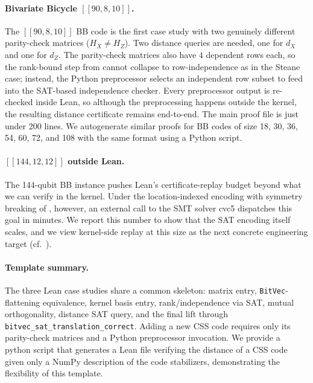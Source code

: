 \paragraph{Bivariate Bicycle $[[90,8,10]]$.} The $[[90,8,10]]$ BB code is the
first case study with two genuinely different parity-check matrices ($H_X \neq
H_Z$). Two distance queries are needed, one for $d_X$ and one for $d_Z$. The
parity-check matrices also have $4$ dependent rows each, so the rank-bound step
from  cannot collapse to row-independence as in the Steane
case; instead, the Python preprocessor selects an independent row subset to feed
into the SAT-based independence checker. Every preprocessor output is re-checked
inside Lean, so although the preprocessing happens outside the kernel, the
resulting distance certificate remains end-to-end. The main proof file is just
under 200 lines. We autogenerate similar proofs for BB codes of size 18, 30, 36, 54, 60, 72, and 108 with the same format using a Python script. 

\paragraph{$[[144,12,12]]$ outside Lean.} The 144-qubit BB instance pushes
Lean's certificate-replay budget beyond what we can verify in the kernel. Under
the location-indexed encoding with symmetry breaking of , however, an external call to the SMT solver cvc5 dispatches this goal in minutes. We report
this number to show that the SAT encoding itself scales, and we view kernel-side
replay at this size as the next concrete engineering target (cf.\
).

\paragraph{Template summary.} The three Lean case studies share a common
skeleton: matrix entry, \lstinline{BitVec}-flattening equivalence, kernel basis
entry, rank/independence via SAT, mutual orthogonality, distance SAT query, and
the final lift through \lstinline{bitvec_sat_translation_correct}. Adding a new
CSS code requires only its parity-check matrices and a Python preprocessor
invocation. We provide a python script that generates a Lean file verifying the distance of a CSS code given only a NumPy description of the code stabilizers, demonstrating the flexibility of this template.

